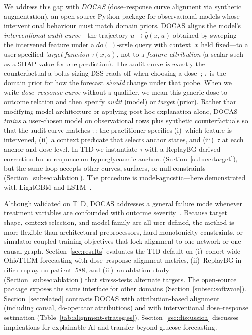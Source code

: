 \documentclass[a4paper,fleqn]{cas-sc}
\begin{document}
We address this gap with \emph{DOCAS} (dose--response curve alignment via
synthetic augmentation), an open-source Python package for observational models
whose interventional behaviour must match domain priors. DOCAS aligns the
model's \emph{interventional audit curve}---the trajectory $u\mapsto\hat g(x,u)$
obtained by sweeping the intervened feature under a $do(\cdot)$-style query with
context~$x$ held fixed---to a user-specified \emph{target function}
$\tau(x,a)$, not to a \emph{feature attribution} (a scalar such as a SHAP
value for one prediction). The audit curve is exactly the counterfactual a
bolus-sizing DSS reads off when choosing a dose~\citep{pearl2009causality,prendin2023,cappon2023};
$\tau$ is the domain prior for how the forecast \emph{should} change under
that probe. When we write \emph{dose--response curve} without a qualifier, we
mean this generic dose-to-outcome relation and then specify \emph{audit} (model)
or \emph{target} (prior). Rather than modifying model architecture or applying
post-hoc explanation alone, DOCAS \emph{trains} a user-chosen model on
observational rows plus synthetic counterfactuals so that the audit curve
matches $\tau$: the practitioner specifies (i)~which feature is intervened,
(ii)~a context predicate that selects anchor states, and (iii)~$\tau$ at each
anchor and dose level. In T1D we instantiate $\tau$ with a ReplayBG-derived
correction-bolus response on hyperglycaemic anchors
(Section~\ref{subsec:target}), but the same
loop accepts other curves, surfaces, or null constraints
(Section~\ref{subsec:ablation}). The procedure is model-agnostic---here
demonstrated with LightGBM and LSTM~\citep{ke2017}.

Although validated on T1D, DOCAS addresses a general failure mode whenever
treatment variables are confounded with outcome
severity~\citep{scholkopf2021,geirhos2020}. Because target shape, context
selection, and model family are all user-defined, the method is more flexible
than architectural preprocessors, hard monotonicity constraints, or
simulator-coupled training objectives that lock alignment to one network or
one causal graph. Section~\ref{sec:results} evaluates the T1D default on
(i)~cohort-wide OhioT1DM forecasting with dose--response alignment metrics,
(ii)~ReplayBG in-silico replay on patient~588, and (iii)~an ablation study
(Section~\ref{subsec:ablation}) that stress-tests alternate targets. The
open-source package exposes the same interface for other domains
(Section~\ref{subsec:software}). Section~\ref{sec:related} contrasts DOCAS with
attribution-based alignment (including causal, do-operator attributions) and
with interventional dose--response estimation
(Table~\ref{tab:alignment-strategies}).
Section~\ref{sec:discussion} discusses implications for explainable AI and
transfer beyond glucose forecasting.
\end{document}
